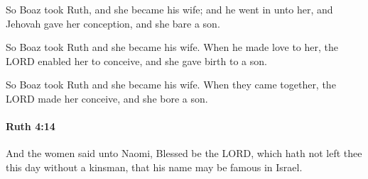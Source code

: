 			\begin{versebox}
					\item[BHS] 
					\item[LXX] 
					\item[ASV] So Boaz took Ruth, and she became his wife; and he went in unto her, and Jehovah gave her conception, and she bare a son.
					\item[NIV] So Boaz took Ruth and she became his wife. When he made love to her, the LORD enabled her to conceive, and she gave birth to a son.
					\item[NRSV] So Boaz took Ruth and she became his wife. When they came together, the LORD made her conceive, and she bore a son.
			\end{versebox}

		\paragraph{Ruth 4:14} %
			\label{RUTH-4-14}

			And the women said unto Naomi, Blessed be the LORD, which hath not left thee this day without a kinsman, that his name may be famous in Israel.

